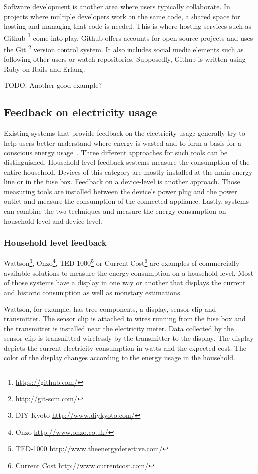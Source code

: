 Software development is another area where users typically collaborate. In projects where multiple developers work on the same code, a shared space for hosting and managing that code is needed. This is where hosting services such as Github \footnote{\url{https://github.com/}} come into play. Github offers accounts for open source projects and uses the Git \footnote{\url{http://git-scm.com/}} version control system. It also includes social media elements such as following other users or watch repositories. Supposedly, Github is written using Ruby on Rails and Erlang\cite{wikipedia_github}. 

TODO: Another good example?

\subsection{Feedback on electricity usage}
Existing systems that provide feedback on the electricity usage generally try to help users better understand where energy is wasted and to form a basis for a conscious energy usage~\cite{mattern:inproc:2010}. Three different approaches for such tools can be distinguished. Household-level feedback systems  measure the consumption of the entire household. Devices of this category are mostly installed at the main energy line or in the fuse box. Feedback on a device-level is another approach. Those measuring tools are installed between the device's power plug and the power outlet and measure the consumption of the connected appliance. Lastly, systems can combine the two techniques and measure the energy consumption on household-level and device-level.

\subsubsection{Household level feedback}
Wattson\footnote{DIY Kyoto \url{http://www.diykyoto.com/}}, Onzo\footnote{Onzo \url{http://www.onzo.co.uk/}}, TED-1000\footnote{
TED-1000 \url{http://www.theenergydetective.com/}} or Current Cost\footnote{Current Cost \url{http://www.currentcost.com/}} are examples of commercially available solutions to measure the energy consumption on a household level.  Most of those systems have a display in one way or another that displays the current and historic consumption as well as monetary estimations.  

Wattson, for example, has tree components, a display, sensor clip and transmitter. The sensor clip is attached to wires running from the fuse box and the transmitter is installed near the electricity meter. Data collected by the sensor clip is transmitted wirelessly by the transmitter to the display. The display depicts the current electricity consumption in watts and the expected cost. The color of the display changes according to the energy usage in the household. 

